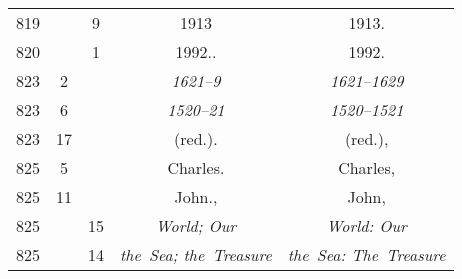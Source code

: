 \documentclass[a4paper,11pt]{article}
\begin{document}
\begin{center}
\begin{tabular}{|c|c|c|c|c|}
    819 & & \hphantom{0}9 & 1913 & 1913. \\
    820 & & \hphantom{0}1 & 1992.. & 1992. \\
    823 & \hphantom{0}2 & & \textit{1621--9} & \textit{1621--1629} \\
    823 & \hphantom{0}6 & & \textit{1520--21} & \textit{1520--1521} \\
    823 & 17 & & (red.). & (red.), \\
    825 & \hphantom{0}5 & & Charles. & Charles, \\
    825 & 11 & & John., & John, \\
    825 & & 15 & \textit{World; Our} & \textit{World: Our} \\
    825 & & 14 & \textit{the~Sea; the~Treasure}
    & \textit{the~Sea: The~Treasure} \\
    \hline
  \end{tabular}





  \newpage


\end{center}
\end{document}
